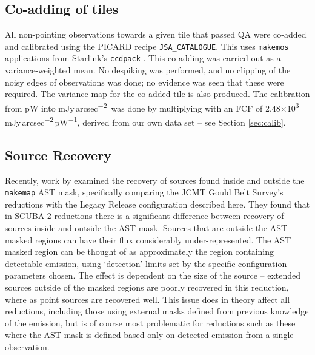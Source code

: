 \documentclass[twocolumn,times]{aastex6}
\newcommand{\um}{\micron}
\newcommand{\todo}[1]{\textcolor{red}{TODO: #1}}
\newcommand{\ascl}[1]{\href{http://www.ascl.net/#1}{ascl:#1}}
\newcommand{\jyas}{Jy\,arcsec\textsuperscript{$-$2}}
\begin{document}



\subsection{Co-adding of tiles}
\label{sec:coadd}
All non-pointing observations towards a given tile that passed QA were
co-added and calibrated using the PICARD recipe
\texttt{JSA\_CATALOGUE}. This uses \texttt{makemos} applications from
Starlink's \texttt{ccdpack} \citep[][\ascl{1403.021}]{SUN139}. This
co-adding was carried out as a variance-weighted mean. No despiking
was performed, and no clipping of the noisy edges of observations was
done; no evidence was seen that these were required. The variance map
for the co-added tile is also produced. The calibration from pW into
m\jyas\ was done by multiplying with an FCF of
2.48$\times$10\textsuperscript{3}\,m\jyas\,pW\textsuperscript{$-$1},
derived from our own data set -- see Section \ref{sec:calib}.

\subsection{Source Recovery}
Recently, work by \citet{Mairs2015} examined the recovery of sources
found inside and outside the \texttt{makemap} AST mask, specifically comparing
the JCMT Gould Belt Survey's reductions with the Legacy Release configuration
described here. They found that in SCUBA-2 reductions there is a
significant difference between recovery of sources inside and outside
the AST mask. Sources that are outside the AST-masked regions can have
their flux considerably under-represented. The AST masked region can be
thought of as approximately the region containing detectable emission,
using `detection' limits set by the specific configuration parameters
chosen. The effect is dependent on the size of the source -- extended
sources outside of the masked regions are poorly recovered in this
reduction, where as point sources are recovered well.  This issue does
in theory affect all reductions, including those using external masks
defined from previous knowledge of the emission, but is of course most
problematic for reductions such as these where the AST mask is defined
based only on detected emission from a single observation.
\end{document}
